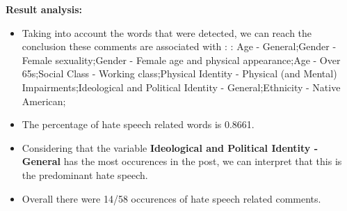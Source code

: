 \documentclass[11pt]{article}
\begin{document}
\textbf{\Large Result analysis:}

\begin{itemize}\item Taking into account the words that were detected, we can reach the conclusion these comments are associated with : : Age - General;Gender - Female sexuality;Gender - Female age and physical appearance;Age - Over 65s;Social Class - Working class;Physical Identity - Physical (and Mental) Impairments;Ideological and Political Identity - General;Ethnicity - Native American;%

\item The percentage of hate speech related words is 0.8661.

\item Considering that the variable \textbf{Ideological and Political Identity - General} has the most occurences in the post, we can interpret that this is the predominant hate speech.

\item Overall there were 14/58 occurences of hate speech related comments.\end{itemize}
\end{document}
